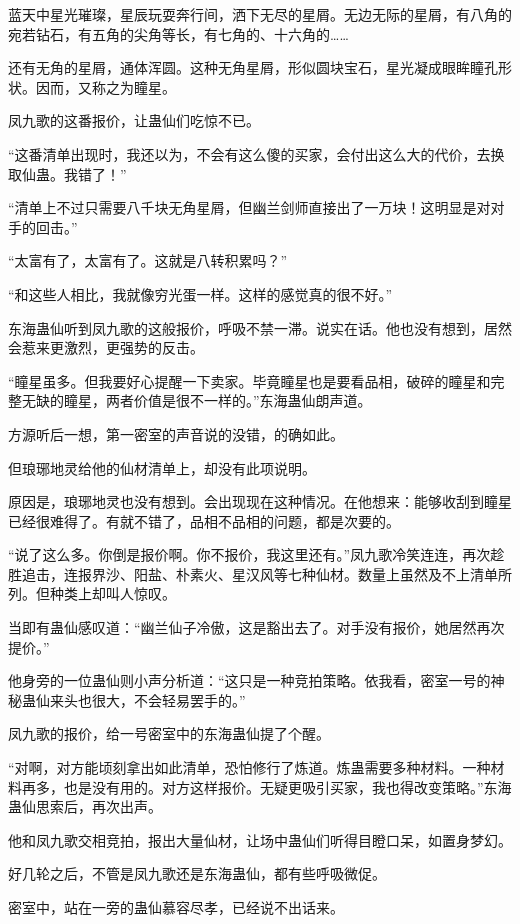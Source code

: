 \begin{this_body}
蓝天中星光璀璨，星辰玩耍奔行间，洒下无尽的星屑。无边无际的星屑，有八角的宛若钻石，有五角的尖角等长，有七角的、十六角的……

还有无角的星屑，通体浑圆。这种无角星屑，形似圆块宝石，星光凝成眼眸瞳孔形状。因而，又称之为瞳星。

凤九歌的这番报价，让蛊仙们吃惊不已。

“这番清单出现时，我还以为，不会有这么傻的买家，会付出这么大的代价，去换取仙蛊。我错了！”

“清单上不过只需要八千块无角星屑，但幽兰剑师直接出了一万块！这明显是对对手的回击。”

“太富有了，太富有了。这就是八转积累吗？”

“和这些人相比，我就像穷光蛋一样。这样的感觉真的很不好。”

东海蛊仙听到凤九歌的这般报价，呼吸不禁一滞。说实在话。他也没有想到，居然会惹来更激烈，更强势的反击。

“瞳星虽多。但我要好心提醒一下卖家。毕竟瞳星也是要看品相，破碎的瞳星和完整无缺的瞳星，两者价值是很不一样的。”东海蛊仙朗声道。

方源听后一想，第一密室的声音说的没错，的确如此。

但琅琊地灵给他的仙材清单上，却没有此项说明。

原因是，琅琊地灵也没有想到。会出现现在这种情况。在他想来：能够收刮到瞳星已经很难得了。有就不错了，品相不品相的问题，都是次要的。

“说了这么多。你倒是报价啊。你不报价，我这里还有。”凤九歌冷笑连连，再次趁胜追击，连报界沙、阳盐、朴素火、星汉风等七种仙材。数量上虽然及不上清单所列。但种类上却叫人惊叹。

当即有蛊仙感叹道：“幽兰仙子冷傲，这是豁出去了。对手没有报价，她居然再次提价。”

他身旁的一位蛊仙则小声分析道：“这只是一种竞拍策略。依我看，密室一号的神秘蛊仙来头也很大，不会轻易罢手的。”

凤九歌的报价，给一号密室中的东海蛊仙提了个醒。

“对啊，对方能顷刻拿出如此清单，恐怕修行了炼道。炼蛊需要多种材料。一种材料再多，也是没有用的。对方这样报价。无疑更吸引买家，我也得改变策略。”东海蛊仙思索后，再次出声。

他和凤九歌交相竞拍，报出大量仙材，让场中蛊仙们听得目瞪口呆，如置身梦幻。

好几轮之后，不管是凤九歌还是东海蛊仙，都有些呼吸微促。

密室中，站在一旁的蛊仙慕容尽孝，已经说不出话来。


\end{this_body}
